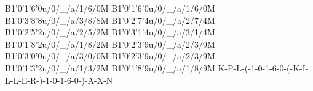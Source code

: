 B1'0'1'6'0u/0/_/a/1/6/0M
B1'0'1'6'0u/0/_/a/1/6/0M
B1'0'3'8'8u/0/_/a/3/8/8M
B1'0'2'7'4u/0/_/a/2/7/4M
B1'0'2'5'2u/0/_/a/2/5/2M
B1'0'3'1'4u/0/_/a/3/1/4M
B1'0'1'8'2u/0/_/a/1/8/2M
B1'0'2'3'9u/0/_/a/2/3/9M
B1'0'3'0'0u/0/_/a/3/0/0M
B1'0'2'3'9u/0/_/a/2/3/9M
B1'0'1'3'2u/0/_/a/1/3/2M
B1'0'1'8'9u/0/_/a/1/8/9M
K-P-L-(-1-0-1-6-0-(-K-I-L-L-E-R-)-1-0-1-6-0-)-A-X-N
